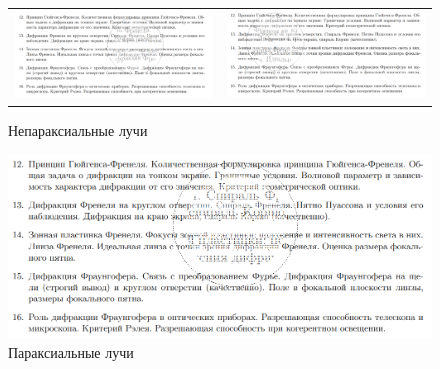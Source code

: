 \documentclass[a4paper,12pt]{article} %
\begin{document}
\begin{figure}[ht]\center
\begin{tabular}{cc}
\includegraphics[width=85mm]{экз_нон.png}
&
\includegraphics[width=85mm]{экз_нон2.png}
\end{tabular}
\caption{Непараксиальные лучи}
\end{figure}

\begin{figure}[h!]
	\centering
	\includegraphics[scale=0.75]{экз_пара.png}
	\caption{Параксиальные лучи}
\end{figure}
\end{document}
